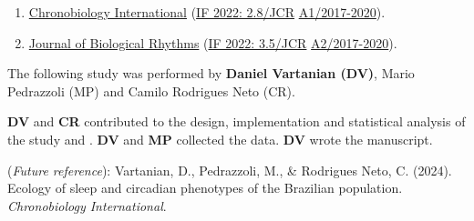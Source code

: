 \documentclass[
  12pt,
  a4paper,
  oneside]{tesesusp}
\providecommand{\tightlist}{%
  \setlength{\itemsep}{0pt}\setlength{\parskip}{0pt}}\usepackage{longtable,booktabs,array}
\begin{document}
\begin{tcolorbox}[enhanced jigsaw, breakable, colback=white, colbacktitle=quarto-callout-note-color!10!white, leftrule=.75mm, left=2mm, toprule=.15mm, opacityback=0, rightrule=.15mm, title=\textcolor{quarto-callout-note-color}{\faInfo}\hspace{0.5em}{Target}, opacitybacktitle=0.6, bottomtitle=1mm, titlerule=0mm, toptitle=1mm, coltitle=black, colframe=quarto-callout-note-color-frame, bottomrule=.15mm, arc=.35mm]

\begin{enumerate}
\def\labelenumi{\arabic{enumi}.}
\tightlist
\item
  \href{https://www.tandfonline.com/action/authorSubmission?show=instructions\&journalCode=icbi20}{Chronobiology
  International} (\href{https://jcr.clarivate.com/jcr/}{IF 2022:
  2.8/JCR} \textbar{}
  \href{https://sucupira.capes.gov.br/sucupira/public/consultas/coleta/veiculoPublicacaoQualis/listaConsultaGeralPeriodicos.jsf}{A1/2017-2020}).
\item
  \href{https://journals.sagepub.com/author-instructions/JBR}{Journal of
  Biological Rhythms} (\href{https://jcr.clarivate.com/jcr/}{IF 2022:
  3.5/JCR} \textbar{}
  \href{https://sucupira.capes.gov.br/sucupira/public/consultas/coleta/veiculoPublicacaoQualis/listaConsultaGeralPeriodicos.jsf}{A2/2017-2020}).
\end{enumerate}

\end{tcolorbox}

\begin{tcolorbox}[enhanced jigsaw, breakable, colback=white, colbacktitle=quarto-callout-note-color!10!white, leftrule=.75mm, left=2mm, toprule=.15mm, opacityback=0, rightrule=.15mm, title=\textcolor{quarto-callout-note-color}{\faInfo}\hspace{0.5em}{Note}, opacitybacktitle=0.6, bottomtitle=1mm, titlerule=0mm, toptitle=1mm, coltitle=black, colframe=quarto-callout-note-color-frame, bottomrule=.15mm, arc=.35mm]

The following study was performed by \textbf{Daniel Vartanian (DV)},
Mario Pedrazzoli (MP) and Camilo Rodrigues Neto (CR).

\textbf{DV} and \textbf{CR} contributed to the design, implementation
and statistical analysis of the study and . \textbf{DV} and \textbf{MP}
collected the data. \textbf{DV} wrote the manuscript.

(\emph{Future reference}): Vartanian, D., Pedrazzoli, M., \& Rodrigues
Neto, C. (2024). Ecology of sleep and circadian phenotypes of the
Brazilian population. \emph{Chronobiology International}.

\end{tcolorbox}
\end{document}

